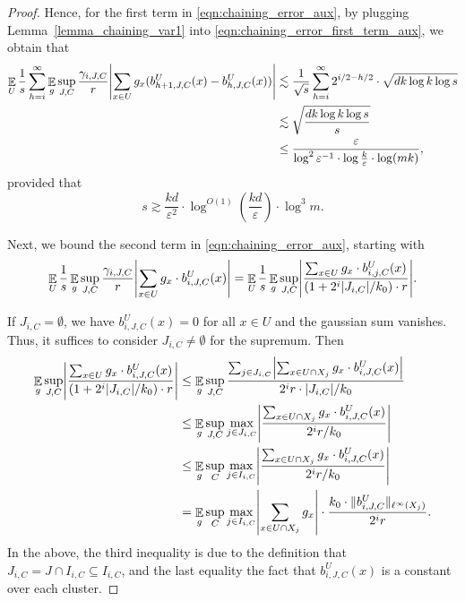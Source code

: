 \documentclass[11pt,letterpaper]{article}
\theoremstyle{definition}
\newcommand{\eps}{\varepsilon}
\DeclareMathOperator*{\E}{\ensuremath{\mathbb{E}}}
\DeclarePairedDelimiter{\abs}{\lvert}{\rvert}
\DeclarePairedDelimiter{\norm}{\lVert}{\rVert}
\begin{document}
\begin{proof}
Hence, for the first term in \eqref{eqn:chaining_error_aux}, by plugging Lemma~\ref{lemma_chaining_var1} into \eqref{eqn:chaining_error_first_term_aux}, we obtain that
\begin{equation}\label{eqn:chaining_error_first_term_final}
\begin{aligned}
\E_U \frac{1}{s} \sum_{h=i}^\infty \E_g \sup_{J,C} \frac{\gamma_{i,J,C}}{r} \abs*{\sum_{x\in U} g_x (b_{h+1,J,C}^U(x)-b_{h,J,C}^U(x))}   
\lesssim{} &  \frac{1}{\sqrt{s}}\sum_{h=i}^{\infty} 2^{i/2-h/2} \cdot \sqrt{dk\log k \log s} \\
\lesssim{} &  \sqrt{\frac{dk\log k \log s}{s}}\\
\leq{} &  \frac{\eps}{\log^2 \eps^{-1}\cdot \log \frac{k}{\eps}\cdot \log (mk)},
\end{aligned}
\end{equation}
provided that
\[
    s \gtrsim \frac{kd}{\eps^2} \cdot \log^{O(1)}(\frac{kd}{\eps})\cdot  \log^3 m.
\]

Next, we bound the second term in \eqref{eqn:chaining_error_aux}, starting with
\[
\E_U\frac{1}{s}\E_g \sup_{J,C} \frac{\gamma_{i,J,C}}{r} \abs*{\sum_{x\in U} g_x \cdot b_{i,J,C}^U(x)}
 =
\E_U\frac{1}{s}\E_g \sup_{J,C} \abs*{ \frac{\sum_{x\in U} g_x \cdot b_{i,j,C}^U(x)}{(1+2^i|J_{i,C}|/k_0)\cdot r} }.
\]

If $J_{i,C}=\emptyset$, we have $b_{i,J,C}^U(x)=0$ for all $x\in U$ and the gaussian sum vanishes. Thus, it suffices to consider $J_{i,C}\neq\emptyset$ for the supremum. Then
\begin{align*}
\E_g \sup_{J,C} \abs*{ \frac{\sum_{x\in U} g_x \cdot b_{i,J,C}^U(x)}{(1+2^i|J_{i,C}|/k_0)\cdot r}
}
&\leq \E_g \sup_{J,C} \frac{\sum_{j\in J_{i,C}} \abs*{\sum_{x\in U\cap X_j} g_x \cdot b_{i,J,C}^U(x)}}{2^ir\cdot|J_{i,C}|/k_0} \\
&\leq \E_g\sup_{J,C}\max_{j\in J_{i,C}} \abs*{ \frac{\sum_{x\in U\cap X_j} g_x\cdot b_{i,J,C}^U(x)}{2^ir/k_0} }\\
&\leq \E_g \sup_{C}\max_{j\in I_{i,C}} \abs*{ \frac{\sum_{x\in U\cap X_j} g_x\cdot b_{i,J,C}^U(x)}{2^ir/k_0} }\\
&= \E_g \sup_{C}\max_{j\in I_{i,C}} \abs*{ \sum_{x\in U\cap X_j} g_x }\cdot \frac{k_0\cdot \norm{b_{i,J,C}^U}_{\ell^\infty(X_j)}}{2^ir}. 
\end{align*}
In the above, the third inequality is due to the definition that $J_{i,C}=J\cap I_{i,C}\subseteq I_{i,C}$, and the last equality the fact that $b_{i,J,C}^U(x)$ is a constant over each cluster.


\end{proof}
\end{document}
